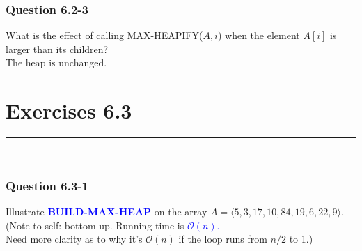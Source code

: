 \documentclass[11pt]{article}
\begin{document}
\vspace{30pt}

\subsubsection*{Question 6.2-3}\nointerlineskip
What is the effect of calling MAX-HEAPIFY($A, i$) when the element $A[i]$ is larger than its children?\\[12pt]
The heap is unchanged.

\newpage
\section*{Exercises 6.3}\nointerlineskip
\noindent \rule{\linewidth}{0.01pt}\\

\subsubsection*{Question 6.3-1}\nointerlineskip
Illustrate \textcolor{blue}{\textbf{BUILD-MAX-HEAP}} on the array $A=\langle 5, 3, 17, 10, 84, 19, 6, 22,9\rangle$.\\
(Note to self: bottom up. Running time is  \textcolor{blue}{$\mathcal{O}(n)$.}\\
Need more clarity as to why it's $\mathcal{O}(n)$ if the loop runs from $n/2$ to 1.)\\
\vspace{20 pt}
\end{document}
